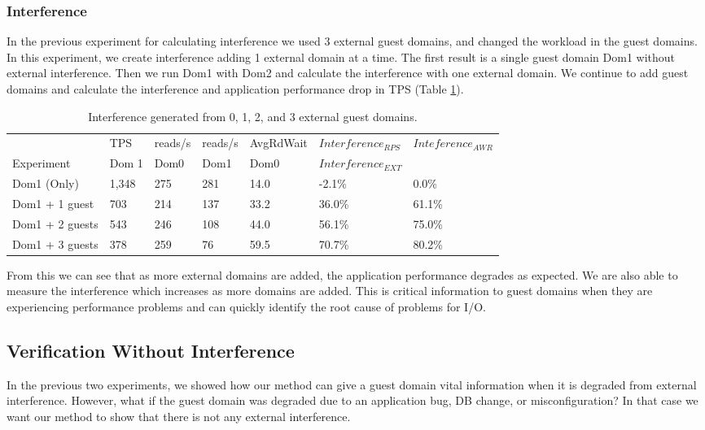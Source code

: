 \subsubsection{Interference}
In the previous experiment for calculating interference we used 3 external guest domains, and changed the workload in the guest domains.  In this experiment, we create interference adding 1 external domain at a time.  The first result is a single guest domain Dom1 without external interference.  Then we run Dom1 with Dom2 and calculate the interference with one external domain.  We continue to add guest domains and calculate the interference and application performance drop in TPS (Table \ref{tab:domains}).

\begin{table}[!h]
\begin{tabular}{ l l l l l l p{9cm} }
                   & TPS   & reads/s & reads/s & AvgRdWait & $Interference_{RPS}$ & $Inteference_{AWR}$ \\
	Experiment     & Dom 1 & Dom0     & Dom1     & Dom0      & $Interference_{EXT}$ &             \\
	\hline
    Dom1 (Only)     &1,348 & 275      & 281      & 14.0     &  -2.1\%  &   0.0\%   \\
    Dom1 + 1 guest  &  703 & 214      & 137      & 33.2     &  36.0\%  &   61.1\%  \\
    Dom1 + 2 guests &  543 & 246      & 108      & 44.0     &  56.1\%  &   75.0\%    \\
    Dom1 + 3 guests &  378 & 259      &  76      & 59.5     &  70.7\%  &   80.2\%  \\
\end{tabular}
\caption{Interference generated from 0, 1, 2, and 3 external guest domains.}
\label{tab:domains}
\end{table}

From this we can see that as more external domains are added, the application performance degrades as expected.  We are also able to measure the interference which increases as more domains are added.  This is critical information to guest domains when they are experiencing performance problems and can quickly identify the root cause of problems for I/O.

\subsection{Verification Without Interference}
In the previous two experiments, we showed how our method can give a guest domain vital information when it is degraded from external interference.  However, what if the guest domain was degraded due to an application bug, DB change, or misconfiguration?   In that case we want our method to show that there is not any external interference.

